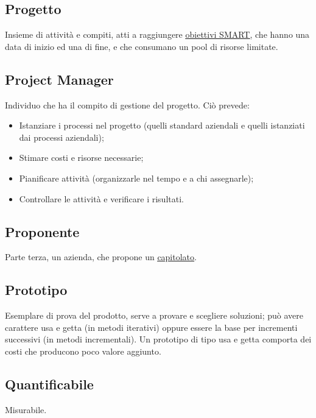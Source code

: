 	\subsection{Progetto}
	\label{sec:progetto}
	Insieme di attività e compiti, atti a raggiungere \underline{\hyperref[sec:smart]{obiettivi SMART}}, che hanno una data di inizio ed una di fine, e che consumano un pool di risorse limitate.

	
	\subsection{Project Manager}
	\label{sec:projectmanager}
	Individuo che ha il compito di gestione del progetto. Ciò prevede:
	\begin{itemize}
	\item Istanziare i processi nel progetto (quelli standard aziendali e quelli istanziati dai processi aziendali);
	\item Stimare costi e risorse necessarie;
	\item Pianificare attività (organizzarle nel tempo e a chi assegnarle);
	\item Controllare le attività e verificare i risultati.
	\end{itemize}


	\subsection{Proponente}
	\label{sec:proponente}
	Parte terza, un azienda, che propone un \underline{\hyperref[sec:capitolato]{capitolato}}. 

	
	\subsection{Prototipo}
	\label{sec:prototipo}
	Esemplare di prova del prodotto, serve a provare e scegliere soluzioni; può avere carattere usa e getta (in metodi iterativi) oppure essere la base per incrementi successivi (in metodi incrementali).
	Un prototipo di tipo usa e getta comporta dei costi che producono poco valore aggiunto.


	\newpage

	
	\subsection{Quantificabile}
	\label{sec:quantificabile}
	Misurabile.

